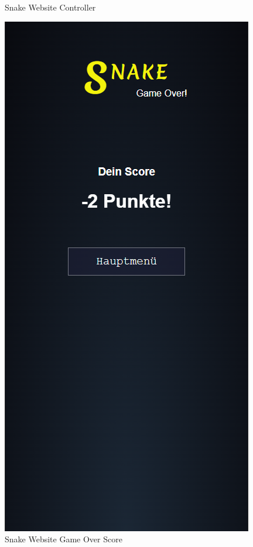 \documentclass[a4paper,12pt]{scrartcl}
\begin{document}
\begin{figure}[!h]
\begin{minipage}[t]{.4\linewidth}
      \caption{Snake Website Controller}
      \label{fig:controller}
   \end{minipage}
   \hspace{.1\linewidth}%
   \begin{minipage}[t]{.4\linewidth}
      \includegraphics[width=\linewidth]{Abbildungen/Snake_Gameover.png}
      \caption{Snake Website Game Over Score}
      \label{fig:gameover}
   \end{minipage}
\end{figure}
\end{document}
